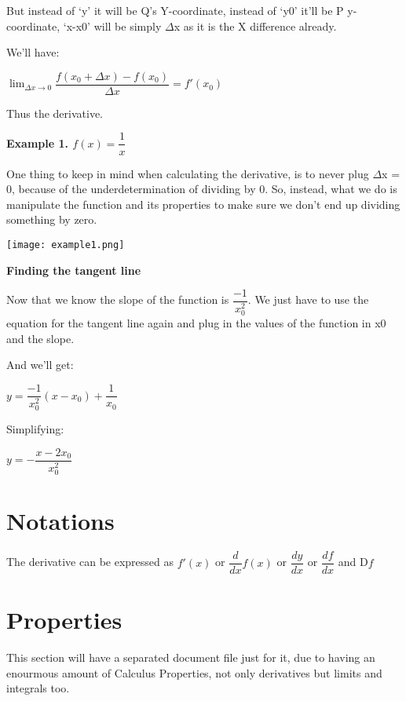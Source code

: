 \documentclass{article}
\begin{document}
But instead of `y' it will be Q's Y-coordinate, instead of `y0' it'll be
P y-coordinate, `x-x0' will be simply $\Delta$x as it is the X difference already. 

We'll have:

\begin{center}
\begin{math}
    \lim_{\Delta x\to 0} \dfrac{f(x_0+\Delta x) - f(x_0)}{\Delta x} = f'(x_0)
\end{math}
\end{center}

Thus the derivative.

\vspace{1cm}

\Large
\textbf{Example 1. $f(x) = \dfrac{1}{x}$}
\vspace{0.4cm}
\noindent

One thing to keep in mind when calculating the derivative, is to never
plug $\Delta$x = 0, because of the underdetermination of dividing by 0.
So, instead, what we do is manipulate the function and its properties 
to make sure we don't end up dividing something by zero.

\begin{center}
    \texttt{[image: example1.png]}
\end{center}

{\Large
\textbf{Finding the tangent line}
}

Now that we know the slope of the function is $\dfrac{-1}{x_0^2}$.
We just have to use the equation for the tangent line again and plug in 
the values of the function in x0 and the slope.

And we'll get: 

\vspace{0.4cm}

\begin{center}
\begin{math}
    y = \dfrac{-1}{x_0^2}(x-x_0) + \dfrac{1}{x_0}
\end{math}
\end{center}

Simplifying:

\begin{center}
\begin{math}
        y = -\dfrac{x-2x_0}{x_0^2}
\end{math}
\end{center}

\newpage
\section{Notations}

The derivative can be expressed as $f'(x)$ or $\dfrac{d}{dx}f(x)$ or
$\dfrac{dy}{dx}$ or $\dfrac{df}{dx}$ and D$f$

\section{Properties}

This section will have a separated document file just for it, due to having
an enourmous amount of Calculus Properties, not only derivatives but limits
and integrals too.
\end{document}
